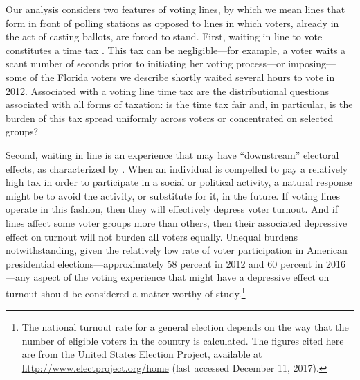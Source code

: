 \documentclass[12pt,titlepage]{article}
\begin{document}


Our analysis considers two features of voting lines, by which we mean
lines that form in front of polling stations as opposed to lines in
which voters, already in the act of casting ballots, are forced to
stand. First, waiting in line to vote constitutes a time tax
\citep{mukherjee:timetax}. This tax can be negligible---for example, a
voter waits a scant number of seconds prior to initiating her voting
process---or imposing---some of the Florida voters we describe shortly
waited several hours to vote in 2012. Associated with a voting line
time tax are the distributional questions associated with all forms of
taxation: is the time tax fair and, in particular, is the burden of
this tax spread uniformly across voters or concentrated on selected
groups?

Second, waiting in line is an experience that may have ``downstream''
electoral effects, as characterized by
\citet{pettigrew:longlinesminorityprecincts}. When an individual is
compelled to pay a relatively high tax in order to participate in a
social or political activity, a natural response might be to avoid the
activity, or substitute for it, in the future.  If voting lines
operate in this fashion, then they will effectively depress voter
turnout.  And if lines affect some voter groups more than others, then
their associated depressive effect on turnout will not burden all
voters equally.  Unequal burdens notwithstanding, given the relatively
low rate of voter participation in American presidential
elections---approximately 58 percent in 2012 and 60 percent in
2016---any aspect of the voting experience that might have a
depressive effect on turnout should be considered a matter worthy of
study.\footnote{The national turnout rate for a general election
  depends on the way that the number of eligible voters in the country
  is calculated.  The figures cited here are from the United States
  Election Project, available at
  \url{http://www.electproject.org/home} (last accessed December 11,
  2017).\label{fn:uselectionproject}}
\end{document}
